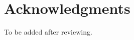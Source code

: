 \documentclass{article}
\begin{document}
\section*{Acknowledgments}
To be added after reviewing.


\small



\end{document}
